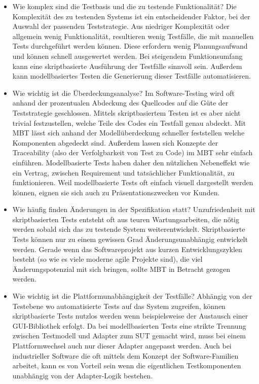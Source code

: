 \begin{itemize}
\item Wie komplex sind die Testbasis und die zu testende Funktionalität?
Die Komplexität des zu testenden Systems ist ein entscheidender Faktor, bei der Auswahl der passenden Teststrategie. Aus niedriger Komplexität oder allgemein wenig Funktionalität, resultieren wenig Testfälle, die mit manuellen Tests durchgeführt werden können. Diese erfordern wenig Planungsaufwand und können schnell ausgewertet werden. Bei steigendem Funktionsumfang kann eine skriptbasierte Ausführung der Testfälle sinnvoll sein. Außerdem kann modellbasiertes Testen die Generierung dieser Testfälle automatisieren.
\item Wie wichtig ist die Überdeckungsanalyse?
Im Software-Testing wird oft anhand der prozentualen Abdeckung des Quellcodes auf die Güte der Teststrategie geschlossen. Mittels skriptbasiertem Testen ist es aber nicht trivial festzustellen, welche Teile des Codes ein Testfall genau abdeckt. Mit MBT lässt sich anhand der Modellüberdeckung schneller feststellen welche Komponenten abgedeckt sind. Außerdem lassen sich Konzepte der Traceability (also der Verfolgbarkeit von Test zu Code) im MBT sehr einfach einführen. Modellbasierte Tests haben daher den nützlichen Nebeneffekt wie ein Vertrag, zwischen Requirement und tatsächlicher Funktionalität, zu funktionieren. Weil modellbasierte Tests oft einfach visuell dargestellt werden können, eignen sie sich auch zu Präsentationszwecken vor Kunden.
\item Wie häufig finden Änderungen in der Spezifikation statt? 
Unzufriedenheit mit skriptbasierten Tests entsteht oft aus teuren Wartungsarbeiten, die nötig werden sobald sich das zu testende System weiterentwickelt. Skriptbasierte Tests können nur zu einem gewissen Grad Änderungsunabhängig entwickelt werden. Gerade wenn das Softwareprojekt aus kurzen Entwicklungszyklen besteht (so wie es viele moderne agile Projekte sind), die viel Änderungspotenzial mit sich bringen, sollte MBT in Betracht gezogen werden.
\item Wie wichtig ist die Plattformunabhängigkeit der Testfälle?
Abhängig von der Testebene wo automatisierte Tests auf das System zugreifen, können skriptbasierte Tests nutzlos werden wenn beispielsweise der Austausch einer GUI-Bibliothek erfolgt. Da bei modellbasierten Tests eine strikte Trennung zwischen Testmodell und Adapter zum SUT gemacht wird, muss bei einem Plattformwechsel auch nur dieser Adapter angepasst werden. Auch bei industrieller Software die oft mittels dem Konzept der Software-Familien arbeitet, kann es von Vorteil sein wenn die eigentlichen Testkomponenten unabhängig von der Adapter-Logik bestehen.

\end{itemize}
